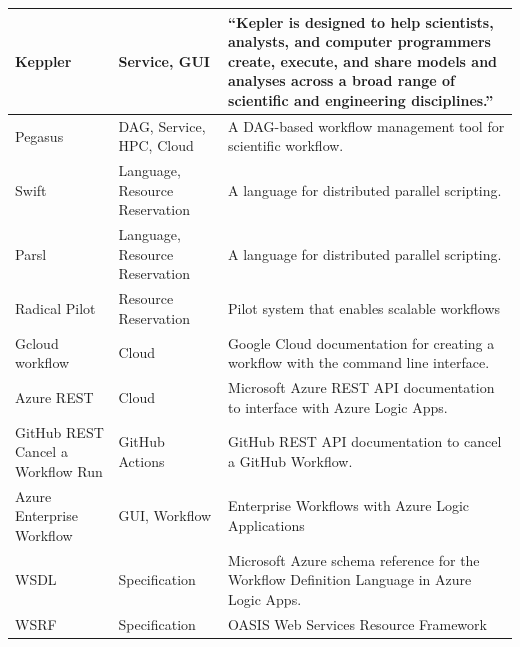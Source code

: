 \documentclass[sigplan,screen]{acmart}
\begin{document}
\begin{table}[htb]
{{\begin{tabular}{|p{3cm}|p{3cm}|p{10cm}|}
Keppler  \cite{www-kepler} & Service, GUI & ``Kepler is designed to help scientists, analysts, and computer programmers create, execute, and share models and analyses across a broad range of scientific and engineering disciplines.'' \\
\hline

Pegasus  \cite{www-pegasus} & DAG, Service, HPC, Cloud &  A DAG-based workflow management tool for scientific workflow.  \\
\hline

Swift \cite{las-2007-swift} & Language, Resource Reservation & A language for distributed parallel scripting.\\
\hline

Parsl \cite{www-parsl} & Language, Resource Reservation & A language for distributed parallel scripting. \\
\hline

Radical Pilot \cite{arxiv-radical-pilot} & Resource Reservation & Pilot system that enables scalable workflows \\ 
\hline

Gcloud workflow \cite{www-gcloud} & Cloud & Google Cloud documentation for creating a workflow with the command line interface. \\
\hline

Azure REST \cite{www-azure-rest} & Cloud & Microsoft Azure REST API documentation to interface with Azure Logic Apps. \\
\hline

GitHub REST Cancel a Workflow Run \cite{www-github-rest-cancel}
& GitHub Actions
& GitHub REST API documentation to cancel a GitHub Workflow. \\
\hline


Azure Enterprise Workflow \cite{www-azure-enterprise-workflow} & GUI,
Workflow & Enterprise Workflows with Azure Logic Applications \\
\hline

WSDL \cite{www-wsdl} & Specification & Microsoft Azure schema reference for the Workflow Definition Language in Azure Logic Apps. \\
  \hline

  WSRF \cite{www-wsrf} & Specification & OASIS Web Services Resource Framework\\


\end{tabular}}}
\end{table}
\end{document}
